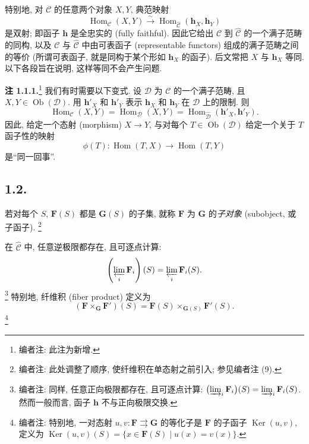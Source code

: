 特别地, 对 \(\mathscr C\) 的任意两个对象 \(X,Y\), 典范映射
\[
  \operatorname{Hom}_{\mathscr C}(X,Y)
    \xrightarrow{\ \sim\ }
  \operatorname{Hom}_{\widehat{\mathscr C}}
    (\mathbf h_X,\mathbf h_Y)
\]
是双射; 即函子 \(\mathbf h\) 是全忠实的 (fully faithful).
因此它给出 \(\mathscr C\) 到 \(\widehat{\mathscr C}\) 的一个满子范畴的同构,
以及 \(\mathscr C\) 与 \(\widehat{\mathscr C}\) 中由可表函子 (representable functors)
组成的满子范畴之间的等价 (所谓可表函子, 就是同构于某个形如 \(\mathbf h_X\) 的函子).
后文常把 \(X\) 与 \(\mathbf h_X\) 等同. 以下各段旨在说明, 这样等同不会产生问题.

\medskip
\noindent{}\textbf{注 1.1.1.}\footnote{编者注: 此注为新增.}
我们有时需要以下变式. 设 \(\mathscr D\) 为 \(\mathscr C\) 的一个满子范畴,
且 \(X,Y\in\operatorname{Ob}(\mathscr D)\).
用 \(\mathbf h'_X\) 和 \(\mathbf h'_Y\) 表示 \(\mathbf h_X\) 和 \(\mathbf h_Y\)
在 \(\mathscr D\) 上的限制. 则
\[
  \operatorname{Hom}_{\mathscr C}(X,Y)
  =\operatorname{Hom}_{\mathscr D}(X,Y)
  =\operatorname{Hom}_{\widehat{\mathscr D}}
      (\mathbf h'_X,\mathbf h'_Y).
\]
因此, 给定一个态射 (morphism) \(X\to Y\), 与对每个
\(T\in\operatorname{Ob}(\mathscr D)\) 给定一个关于 \(T\) 函子性的映射
\[
  \phi(T):\operatorname{Hom}(T,X)\longrightarrow\operatorname{Hom}(T,Y)
\]
是“同一回事”.

\subsection*{1.2.}

若对每个 \(S\), \(\mathbf F(S)\) 都是 \(\mathbf G(S)\) 的子集,
就称 \(\mathbf F\) 为 \(\mathbf G\) 的\emph{子对象} (subobject, 或子函子).
\footnote{编者注: 此处调整了顺序, 使纤维积在单态射之前引入; 参见编者注 (9).}

在 \(\widehat{\mathscr C}\) 中, 任意逆极限都存在, 且可逐点计算:
\[
  \left(\varprojlim_i\mathbf F_i\right)(S)
    =\varprojlim_i\mathbf F_i(S).
\]
\footnote{编者注: 同样, 任意正向极限都存在, 且可逐点计算:
\(\bigl(\varinjlim_i\mathbf F_i\bigr)(S)=
\varinjlim_i\mathbf F_i(S)\). 然而一般而言, 函子 \(\mathbf h\) 不与正向极限交换.}
特别地, 纤维积 (fiber product) 定义为
\[
  (\mathbf F\mathbin{\times_{\mathbf G}}\mathbf F')(S)
    =\mathbf F(S)\mathbin{\times_{\mathbf G(S)}}\mathbf F'(S).
\]
\footnote{编者注: 特别地, 一对态射
\(u,v:\mathbf F\rightrightarrows\mathbf G\) 的等化子是 \(\mathbf F\) 的子函子
\(\operatorname{Ker}(u,v)\), 定义为
\(\operatorname{Ker}(u,v)(S)=
\{x\in\mathbf F(S)\mid u(x)=v(x)\}\).}

